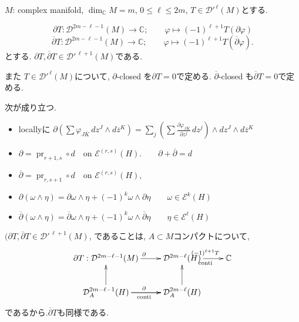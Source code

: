 \begin{tcolorbox}[mybox]
\begin{defn}
\label{defn-M-4.13}
 \(M\): complex manifold, \(\dim_{\mathbb{C}}M=m\),  $0\leq \ell\leq 2m$, 
\(T\in \mathcal{D}'^{\,\ell}(M)\)とする. 

\[
\partial T:\mathcal{D}^{2m-\ell-1}(M)\to \mathbb{C};\qquad \varphi\mapsto (-1)^{\ell+1}T(\partial\varphi)
\]
\[
\overline{\partial}T:\mathcal{D}^{2m-\ell-1}(M)\to \mathbb{C};\qquad \varphi\mapsto (-1)^{\ell+1}T(\overline{\partial}\varphi).
\]
とする. 
 \(\partial T,\overline{\partial}T\in \mathcal{D}'^{\,\ell+1}(M)\)である.

また
\(T\in \mathcal{D}'^{\,\ell}(M)\)について, 
\(\partial \)-closed を$\partial T=0$で定める. 
\(\overline{\partial} \)-closed も$\overline{\partial} T=0$で定める. 

\end{defn}
\end{tcolorbox}

次が成り立つ. 
\begin{itemize}
\item locallyに
\(
\partial\left(\sum \varphi_{J\overline{K}}\,dz^{J}\wedge d\overline{z}^{K}\right)
=
\sum_{j}\left(\sum \frac{\partial \varphi_{J\overline{K}}}{\partial z^{j}}\,dz^{j}\right)\wedge dz^{J}\wedge d\overline{z}^{K}
\)
\item \(
\partial=\operatorname{pr}_{r+1,s}\circ d \quad \text{on } \mathcal{E}^{(r,s)}(H).
\qquad
\partial+\overline{\partial}=d
\)
\item 
\(
\overline{\partial}=\operatorname{pr}_{r,s+1}\circ d \quad \text{on } \mathcal{E}^{(r,s)}(H),
\)
\item
\(
\partial(\omega\wedge \eta)=\partial\omega\wedge \eta+(-1)^{k}\omega\wedge \partial\eta
\qquad
\omega\in \mathcal{E}^{k}(H)
\)
\item
\(
\overline{\partial}(\omega\wedge \eta)=\overline{\partial}\omega\wedge \eta+(-1)^{k}\omega\wedge \overline{\partial}\eta
\qquad
\eta\in \mathcal{E}^{\ell}(H)
\)
\end{itemize}

\(
(\partial T,\overline{\partial}T\in \mathcal{D}'^{\,\ell+1}(M)
\), であることは, $A\subset M$コンパクトについて, 
\[
\xymatrix{
\partial T: \mathcal{D}^{2m-\ell-1}(M) \ar[r]^{\partial} &
\mathcal{D}^{2m-\ell}(H) \ar[r]^{(-1)^{\ell+1}T}_{\text{conti}} &
\mathbb{C} \\
\mathcal{D}^{2m-\ell-1}_{A}(H) \ar[r]^{\partial} \ar[u] \ar[r]_{\text{conti}} &
\mathcal{D}^{2m-\ell}_{A}(H) \ar[u]
}
\]
であるから.\(\overline{\partial}T\)も同様である. 

